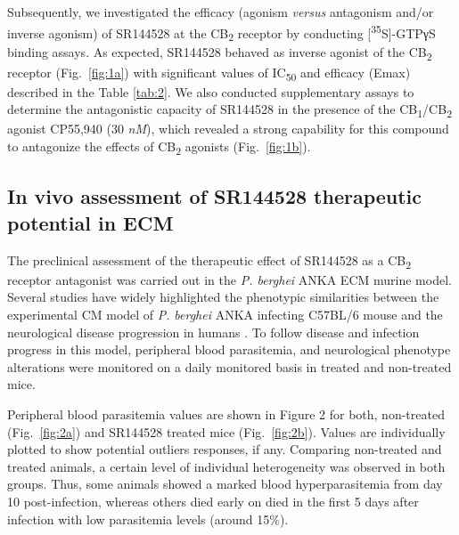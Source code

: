 \documentclass[empirical, authordate]{jote-new-article}
\begin{document}
Subsequently, we investigated the efficacy (agonism \emph{versus} antagonism and/or inverse agonism) of SR144528 at the CB\textsubscript{2 }receptor by conducting [\textsuperscript{35}S]-GTPγS binding assays. As expected, SR144528 behaved as inverse agonist of the CB\textsubscript{2} receptor (Fig.~\ref{fig:1a}) with significant values of IC\textsubscript{50} and efficacy (Emax) described in the Table \ref{tab:2}. We also conducted supplementary assays to determine the antagonistic capacity of SR144528 in the presence of the CB\textsubscript{1}/CB\textsubscript{2} agonist CP55,940 (30 \emph{nM}), which revealed a strong capability for this compound to antagonize the effects of CB\textsubscript{2} agonists (Fig.~\ref{fig:1b}).


\subsection{In vivo assessment of SR144528 therapeutic potential in ECM}




The preclinical assessment of the therapeutic effect of SR144528 as a CB\textsubscript{2} receptor antagonist was carried out in the \emph{P. berghei }ANKA ECM murine model. Several studies have widely highlighted the phenotypic similarities between the experimental CM model of \emph{P. }\emph{berghei}\emph{ }ANKA infecting C57BL/6 mouse and the neurological disease progression in humans \parencite{DeSouza2010, Hunt2003, Lou2001,Medana2006}. To follow disease and infection progress in this model, peripheral blood parasitemia, and neurological phenotype alterations were monitored on a daily monitored basis in treated and non-treated mice.

Peripheral blood parasitemia values are shown in Figure 2 for both, non-treated (Fig.~\ref{fig:2a}) and SR144528 treated mice (Fig.~\ref{fig:2b}). Values are individually plotted to show potential outliers responses, if any. Comparing non-treated and treated animals, a certain level of individual heterogeneity was observed in both groups. Thus, some animals showed a marked blood hyperparasitemia from day 10 post-infection, whereas others died early on died in the first 5 days after infection with low parasitemia levels (around 15\%).
\end{document}
